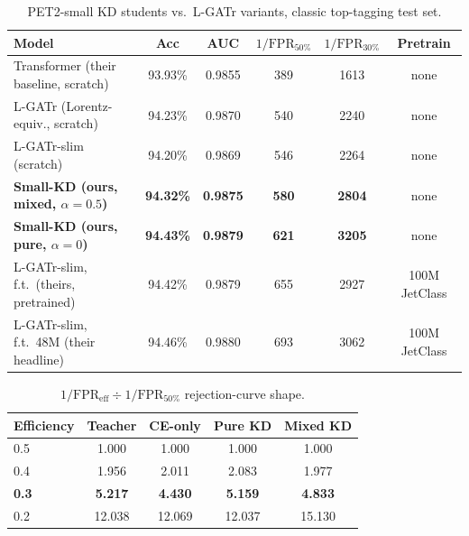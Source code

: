\begin{table}[h]
    \centering
    \small
    \begin{tabular}{lccccc}
        \toprule
        Model & Acc & AUC & $1/\mathrm{FPR}_{50\%}$ & $1/\mathrm{FPR}_{30\%}$ & Pretrain \\
        \midrule
        Transformer (their baseline, scratch) & 93.93\% & 0.9855 & 389 & 1613 & none \\
        L-GATr (Lorentz-equiv., scratch) & 94.23\% & 0.9870 & 540 & 2240 & none \\
        L-GATr-slim (scratch) & 94.20\% & 0.9869 & 546 & 2264 & none \\
        \textbf{Small-KD (ours, mixed, $\alpha{=}0.5$)} & \textbf{94.32\%} & \textbf{0.9875} & \textbf{580} & \textbf{2804} & none \\
        \textbf{Small-KD (ours, pure, $\alpha{=}0$)} & \textbf{94.43\%} & \textbf{0.9879} & \textbf{621} & \textbf{3205} & none \\
        L-GATr-slim, f.t.\ (theirs, pretrained) & 94.42\% & 0.9879 & 655 & 2927 & 100M JetClass \\
        L-GATr-slim, f.t.\ 48M (their headline) & 94.46\% & 0.9880 & 693 & 3062 & 100M JetClass \\
        \bottomrule
    \end{tabular}
    \caption{PET2-small KD students vs.\ L-GATr variants, classic top-tagging
    test set.}
    \label{tab:lgatr-comparison}
\end{table}

\begin{table}[h]
    \centering
    \small
    \begin{tabular}{lcccc}
        \toprule
        Efficiency & Teacher & CE-only & Pure KD & Mixed KD \\
        \midrule
        0.5 & 1.000 & 1.000 & 1.000 & 1.000 \\
        0.4 & 1.956 & 2.011 & 2.083 & 1.977 \\
        \textbf{0.3} & \textbf{5.217} & \textbf{4.430} & \textbf{5.159} & \textbf{4.833} \\
        0.2 & 12.038 & 12.069 & 12.037 & 15.130 \\
        \bottomrule
    \end{tabular}
    \caption{$1/\mathrm{FPR}_{\text{eff}} \div 1/\mathrm{FPR}_{50\%}$
    rejection-curve shape.}
    \label{tab:lgatr-roc-shape}
\end{table}

